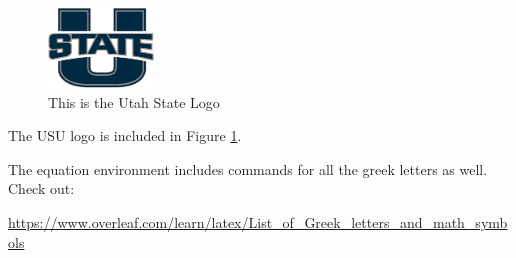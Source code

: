 \documentclass[12pt]{notes}
\begin{document}
\begin{figure}[H] %
\centering
\includegraphics[width = 0.25\textwidth]{figures/module1/usu.png}
\caption{This is the Utah State Logo}
\label{fig1}
\end{figure}
The USU logo is included in Figure \ref{fig1}.

The equation environment includes commands for all the greek letters as well. Check out:

\begin{center}
\url{https://www.overleaf.com/learn/latex/List_of_Greek_letters_and_math_symbols}
\end{center} 
























\end{document}
